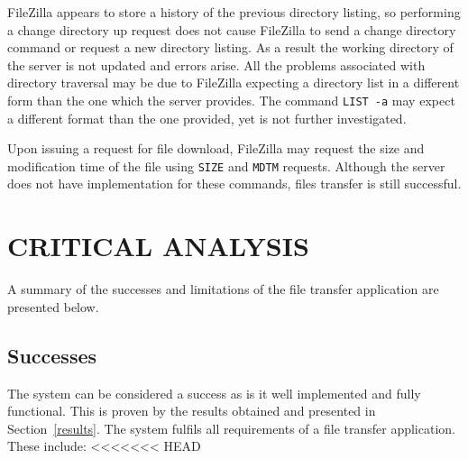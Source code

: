 \documentclass[10pt,twocolumn]{witseiepaper}
\begin{document}
FileZilla appears to store a history of the previous directory listing, so performing a change directory up request does not cause FileZilla to send a change directory command or request a new directory listing. As a result the working directory of the server is not updated and errors arise. All the problems associated with directory traversal may be due to FileZilla expecting a directory list in a different form than the one which the server provides. The command \texttt{LIST~-a} may expect a different format than the one provided, yet is not further investigated.

Upon issuing a request for file download, FileZilla may request the size and modification time of the file using \texttt{SIZE} and \texttt{MDTM} requests. Although the server does not have implementation for these commands, files transfer is still successful.

\section{CRITICAL ANALYSIS}

A summary of the successes and limitations of the file transfer application are presented below.

\subsection{Successes}

The system can be considered a success as is it well implemented and fully functional. This is proven by the results obtained and presented in Section~\ref{results}. The system fulfils all requirements of a file transfer application. These include:
<<<<<<< HEAD

\vspace*{-2mm}
\end{document}
